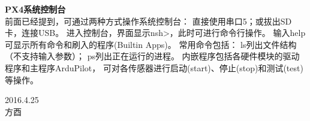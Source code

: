 \documentclass[a4paper,10pt]{ctexart} %
\begin{document}
\vspace{20pt}
\noindent \textbf{PX4系统控制台}\\

前面已经提到，可通过两种方式操作系统控制台：
直接使用串口5；或拔出SD卡，连接USB。
进入控制台，界面显示nsh>，此时可进行命令行操作。
输入help可显示所有命令和刷入的程序(Builtin Apps)。
常用命令包括：
ls列出文件结构（不支持输入参数）；
ps列出正在运行的进程。
内嵌程序包括各硬件模块的驱动程序和主程序ArduPilot，
可对各传感器进行启动(start)、停止(stop)和测试(test)等操作。












\begin{flushright}
\vspace{30pt}
2016.4.25\\
方酉
\end{flushright}
\end{document}
